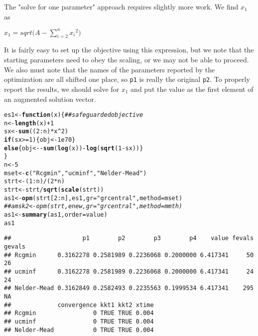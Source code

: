 \documentclass[11pt]{article}\usepackage[]{graphicx}\usepackage[]{color}
\makeatletter
\newcommand{\hlnum}[1]{\textcolor[rgb]{0.686,0.059,0.569}{#1}}%
\newcommand{\hlstr}[1]{\textcolor[rgb]{0.192,0.494,0.8}{#1}}%
\newcommand{\hlcom}[1]{\textcolor[rgb]{0.678,0.584,0.686}{\textit{#1}}}%
\newcommand{\hlopt}[1]{\textcolor[rgb]{0,0,0}{#1}}%
\newcommand{\hlstd}[1]{\textcolor[rgb]{0.345,0.345,0.345}{#1}}%
\newcommand{\hlkwa}[1]{\textcolor[rgb]{0.161,0.373,0.58}{\textbf{#1}}}%
\newcommand{\hlkwb}[1]{\textcolor[rgb]{0.69,0.353,0.396}{#1}}%
\newcommand{\hlkwc}[1]{\textcolor[rgb]{0.333,0.667,0.333}{#1}}%
\newcommand{\hlkwd}[1]{\textcolor[rgb]{0.737,0.353,0.396}{\textbf{#1}}}%
\newenvironment{kframe}{%
 \def\at@end@of@kframe{}%
 \ifinner\ifhmode%
  \def\at@end@of@kframe{\end{minipage}}%
  \begin{minipage}{\columnwidth}%
 \fi\fi%
 \def\FrameCommand##1{\hskip\@totalleftmargin \hskip-\fboxsep
 \colorbox{shadecolor}{##1}\hskip-\fboxsep
     \hskip-\linewidth \hskip-\@totalleftmargin \hskip\columnwidth}%
 \MakeFramed {\advance\hsize-\width
   \@totalleftmargin\z@ \linewidth\hsize
   \@setminipage}}%
 {\par\unskip\endMakeFramed%
 \at@end@of@kframe}
\newenvironment{knitrout}{}{} %
\newcommand{\code}[1]{{\tt#1}}
\makeatother
\begin{document}
The "solve for one parameter" approach requires slightly more work. We find $x_1$ as

$ x_1 = sqrt(A - \sum_{i=2}^n{{x_i}^2) } $

It is fairly easy to set up the objective using this expression, but we note that the
starting parameters need to obey the scaling, or we may not be able to proceed. We also
must note that the names of the parameters reported by the optimization are all shifted
one place, so \code{p1} is really the original \code{p2}. To properly report the 
results, we should solve for $x_1$ and put the value as the first element of an 
augmented solution vector.

\begin{knitrout}\scriptsize
{}\color{fgcolor}\begin{kframe}
\begin{alltt}
\hlstd{es1} \hlkwb{<-} \hlkwa{function}\hlstd{(}\hlkwc{x}\hlstd{)\{} \hlcom{## safeguarded objective}
  \hlstd{n} \hlkwb{<-} \hlkwd{length}\hlstd{(x)}\hlopt{+}\hlnum{1}
  \hlstd{sx} \hlkwb{<-} \hlkwd{sum}\hlstd{((}\hlnum{2}\hlopt{:}\hlstd{n)}\hlopt{*}\hlstd{x}\hlopt{^}\hlnum{2}\hlstd{)}
  \hlkwa{if} \hlstd{(sx} \hlopt{>=} \hlnum{1}\hlstd{) \{obj} \hlkwb{<-} \hlnum{1e70}\hlstd{\}}
  \hlkwa{else} \hlstd{\{obj} \hlkwb{<-} \hlopt{-} \hlkwd{sum}\hlstd{(}\hlkwd{log}\hlstd{(x))} \hlopt{-} \hlkwd{log}\hlstd{(}\hlkwd{sqrt}\hlstd{(}\hlnum{1}\hlopt{-}\hlstd{sx)) \}}
\hlstd{\}}
\hlstd{n} \hlkwb{<-} \hlnum{5}
\hlstd{mset}\hlkwb{<-}\hlkwd{c}\hlstd{(}\hlstr{"Rcgmin"}\hlstd{,} \hlstr{"ucminf"}\hlstd{,} \hlstr{"Nelder-Mead"}\hlstd{)}
\hlstd{strt} \hlkwb{<-} \hlstd{(}\hlnum{1}\hlopt{:}\hlstd{n)}\hlopt{/}\hlstd{(}\hlnum{2}\hlopt{*}\hlstd{n)}
\hlstd{strt}\hlkwb{<-}\hlstd{strt}\hlopt{/}\hlkwd{sqrt}\hlstd{(}\hlkwd{scale}\hlstd{(strt))}
\hlstd{as1} \hlkwb{<-} \hlkwd{opm}\hlstd{(strt[}\hlnum{2}\hlopt{:}\hlstd{n], es1,} \hlkwc{gr}\hlstd{=}\hlstr{"grcentral"}\hlstd{,} \hlkwc{method}\hlstd{=mset)}
\hlcom{## amsk2 <- opm(strt, enew, gr="grcentral", method=mmth)}
\hlstd{as1} \hlkwb{<-} \hlkwd{summary}\hlstd{(as1,} \hlkwc{order}\hlstd{=value)}
\hlstd{as1}
\end{alltt}
\begin{verbatim}
##                    p1        p2        p3        p4    value fevals gevals
## Rcgmin      0.3162278 0.2581989 0.2236068 0.2000000 6.417341     50     26
## ucminf      0.3162278 0.2581989 0.2236068 0.2000000 6.417341     24     24
## Nelder-Mead 0.3162849 0.2582493 0.2235563 0.1999534 6.417341    295     NA
##             convergence kkt1 kkt2 xtime
## Rcgmin                0 TRUE TRUE 0.004
## ucminf                0 TRUE TRUE 0.004
## Nelder-Mead           0 TRUE TRUE 0.004
\end{verbatim}
\end{kframe}
\end{knitrout}
\end{document}
